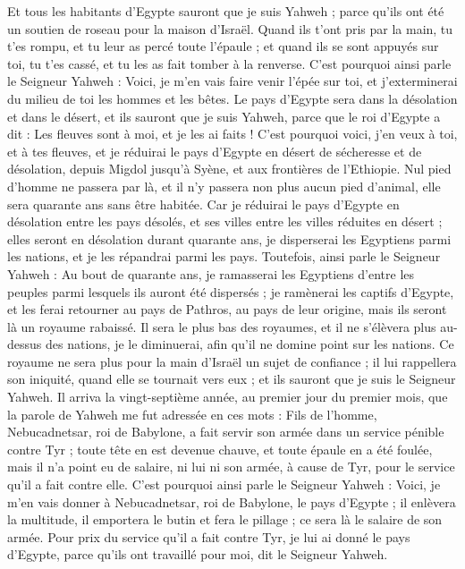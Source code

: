 \begin{multicols}{2}
Et tous les habitants d'Egypte sauront que je suis Yahweh ; parce qu'ils ont été un soutien de roseau pour la maison d'Israël\FTNT{}.
Quand ils t'ont pris par la main, tu t'es rompu, et tu leur as percé toute l'épaule ; et quand ils se sont appuyés sur toi, tu t'es cassé, et tu les as fait tomber à la renverse.
C'est pourquoi ainsi parle le Seigneur Yahweh : Voici, je m'en vais faire venir l'épée sur toi, et j'exterminerai du milieu de toi les hommes et les bêtes.
Le pays d'Egypte sera dans la désolation et dans le désert, et ils sauront que je suis Yahweh, parce que le roi d'Egypte a dit : Les fleuves sont à moi, et je les ai faits !
C'est pourquoi voici, j'en veux à toi, et à tes fleuves, et je réduirai le pays d'Egypte en désert de sécheresse et de désolation, depuis Migdol jusqu’à Syène, et aux frontières de l’Ethiopie.
Nul pied d'homme ne passera par là, et il n'y passera non plus aucun pied d’animal, elle sera quarante ans sans être habitée.
Car je réduirai le pays d'Egypte en désolation entre les pays désolés, et ses villes entre les villes réduites en désert ; elles seront en désolation durant quarante ans, je disperserai les Egyptiens parmi les nations, et je les répandrai parmi les pays.
Toutefois, ainsi parle le Seigneur Yahweh : Au bout de quarante ans, je ramasserai les Egyptiens d'entre les peuples parmi lesquels ils auront été dispersés ;
je ramènerai les captifs d'Egypte, et les ferai retourner au pays de Pathros, au pays de leur origine, mais ils seront là un royaume rabaissé.
Il sera le plus bas des royaumes, et il ne s'élèvera plus au-dessus des nations, je le diminuerai, afin qu'il ne domine point sur les nations.
Ce royaume ne sera plus pour la main d’Israël un sujet de confiance ; il lui rappellera son iniquité, quand elle se tournait vers eux ; et ils sauront que je suis le Seigneur Yahweh.
Il arriva la vingt-septième année, au premier jour du premier mois, que la parole de Yahweh me fut adressée en ces mots :
Fils de l’homme, Nebucadnetsar, roi de Babylone, a fait servir son armée dans un service pénible contre Tyr ; toute tête en est devenue chauve, et toute épaule en a été foulée, mais il n'a point eu de salaire, ni lui ni son armée, à cause de Tyr, pour le service qu'il a fait contre elle.
C'est pourquoi ainsi parle le Seigneur Yahweh : Voici, je m'en vais donner à Nebucadnetsar, roi de Babylone, le pays d'Egypte ; il enlèvera la multitude, il emportera le butin et fera le pillage ; ce sera là le salaire de son armée.
Pour prix du service qu’il a fait contre Tyr, je lui ai donné le pays d'Egypte, parce qu'ils ont travaillé pour moi, dit le Seigneur Yahweh.

\end{multicols}
